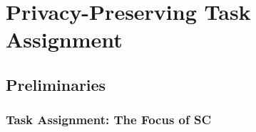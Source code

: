 \documentclass{USC-Thesis}
\numberwithin{equation}{chapter}
\begin{document}




\chapter{Privacy-Preserving Task Assignment}\label{ch.PPTA}

\section{Preliminaries}
\subsection{Task Assignment: The Focus of SC}
\end{document}
